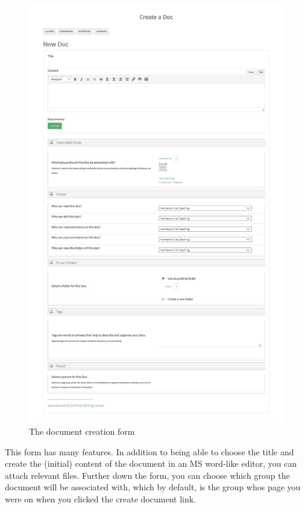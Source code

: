 \documentclass[10pt]{article}
\begin{document}
\begin{figure}[H]
    \centering
    \includegraphics[scale=0.5]{images/doccreationform.jpg}
    \caption{The document creation form}
    \label{doccreationform}
\end{figure}

\begin{flushleft}
This form has many features.  In addition to being able to choose the title and create the (initial) content of the document in an MS word-like editor, you can attach relevant files.  Further down the form, you can choose which group the document will be associated with, which by default, is the group whos page you were on when you clicked the create document link.  
\end{flushleft}
\end{document}
